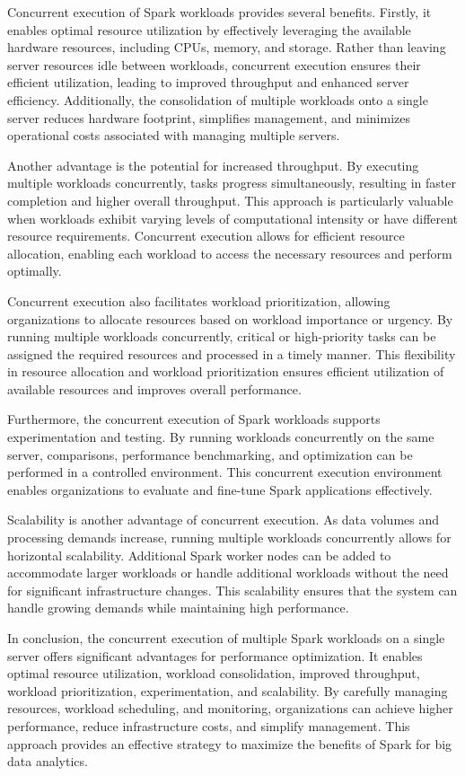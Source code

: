 \documentclass[twocolumn,10pt]{asme2e}
\begin{document}
Concurrent execution of Spark workloads provides several benefits. Firstly, it enables optimal resource utilization by effectively leveraging the available hardware resources, including CPUs, memory, and storage. Rather than leaving server resources idle between workloads, concurrent execution ensures their efficient utilization, leading to improved throughput and enhanced server efficiency. Additionally, the consolidation of multiple workloads onto a single server reduces hardware footprint, simplifies management, and minimizes operational costs associated with managing multiple servers.

Another advantage is the potential for increased throughput. By executing multiple workloads concurrently, tasks progress simultaneously, resulting in faster completion and higher overall throughput. This approach is particularly valuable when workloads exhibit varying levels of computational intensity or have different resource requirements. Concurrent execution allows for efficient resource allocation, enabling each workload to access the necessary resources and perform optimally.

Concurrent execution also facilitates workload prioritization, allowing organizations to allocate resources based on workload importance or urgency. By running multiple workloads concurrently, critical or high-priority tasks can be assigned the required resources and processed in a timely manner. This flexibility in resource allocation and workload prioritization ensures efficient utilization of available resources and improves overall performance.

Furthermore, the concurrent execution of Spark workloads supports experimentation and testing. By running workloads concurrently on the same server, comparisons, performance benchmarking, and optimization can be performed in a controlled environment. This concurrent execution environment enables organizations to evaluate and fine-tune Spark applications effectively.

Scalability is another advantage of concurrent execution. As data volumes and processing demands increase, running multiple workloads concurrently allows for horizontal scalability. Additional Spark worker nodes can be added to accommodate larger workloads or handle additional workloads without the need for significant infrastructure changes. This scalability ensures that the system can handle growing demands while maintaining high performance.

In conclusion, the concurrent execution of multiple Spark workloads on a single server offers significant advantages for performance optimization. It enables optimal resource utilization, workload consolidation, improved throughput, workload prioritization, experimentation, and scalability. By carefully managing resources, workload scheduling, and monitoring, organizations can achieve higher performance, reduce infrastructure costs, and simplify management. This approach provides an effective strategy to maximize the benefits of Spark for big data analytics.
\end{document}
